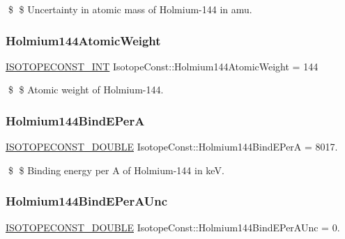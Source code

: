 \$ \$ Uncertainty in atomic mass of Holmium-\/144 in amu. \mbox{\label{group___isotope_const-_holmium-_ho144_gaa7109e46c8a8c2fcc7e3a339cf5b1c61}} 
\subsubsection{\texorpdfstring{Holmium144\+Atomic\+Weight}{Holmium144AtomicWeight}}
{\footnotesize\ttfamily \mbox{\hyperlink{group___isotope_const-_macros_ga5f18360b3e99483a35c32d789e62621c}{I\+S\+O\+T\+O\+P\+E\+C\+O\+N\+S\+T\+\_\+\+I\+NT}} Isotope\+Const\+::\+Holmium144\+Atomic\+Weight = 144}

\$ \$ Atomic weight of Holmium-\/144. \mbox{\label{group___isotope_const-_holmium-_ho144_ga4c7e6d869436ebcc3089d4fe51deae01}} 
\subsubsection{\texorpdfstring{Holmium144\+Bind\+E\+PerA}{Holmium144BindEPerA}}
{\footnotesize\ttfamily \mbox{\hyperlink{group___isotope_const-_macros_ga8f45a7272ce02c0b4c65c44636ed719a}{I\+S\+O\+T\+O\+P\+E\+C\+O\+N\+S\+T\+\_\+\+D\+O\+U\+B\+LE}} Isotope\+Const\+::\+Holmium144\+Bind\+E\+PerA = 8017.}

\$ \$ Binding energy per A of Holmium-\/144 in keV. \mbox{\label{group___isotope_const-_holmium-_ho144_ga0f485385a2e3829eb645d5251c3f30ac}} 
\subsubsection{\texorpdfstring{Holmium144\+Bind\+E\+Per\+A\+Unc}{Holmium144BindEPerAUnc}}
{\footnotesize\ttfamily \mbox{\hyperlink{group___isotope_const-_macros_ga8f45a7272ce02c0b4c65c44636ed719a}{I\+S\+O\+T\+O\+P\+E\+C\+O\+N\+S\+T\+\_\+\+D\+O\+U\+B\+LE}} Isotope\+Const\+::\+Holmium144\+Bind\+E\+Per\+A\+Unc = 0.}

